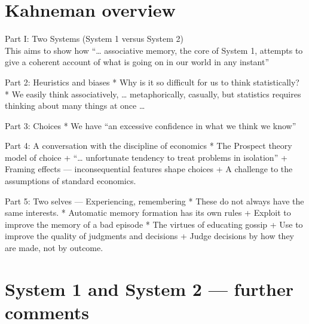 \documentclass[
  10pt,
  b5paper]{book}
\begin{document}
\hypertarget{kahneman-overview}{%
\section{Kahneman overview}\label{kahneman-overview}}

Part I: Two Systems (System 1 versus System 2)\\
This aims to show how
``\ldots{} associative memory, the core of System 1, attempts to give a coherent
account of what is going on in our world in any instant''

Part 2: Heuristics and biases
* Why is it so difficult for us to think statistically?
* We easily think associatively, \ldots{} metaphorically, casually,
but statistics requires thinking about many things at once \ldots{}

Part 3: Choices
* We have ``an excessive confidence in what we think we know''

Part 4: A conversation with the discipline of economics
* The Prospect theory model of choice
+ ``\ldots{} unfortunate tendency to treat problems in isolation''
+ Framing effects --- inconsequential features shape choices
+ A challenge to the assumptions of standard economics.

Part 5: Two selves --- Experiencing, remembering
* These do not always have the same interests.
* Automatic memory formation has its own rules
+ Exploit to improve the memory of a bad episode
* The virtues of educating gossip
+ Use to improve the quality of judgments and decisions
+ Judge decisions by how they are made, not by outcome.

\hypertarget{system-1-and-system-2-further-comments}{%
\section{System 1 and System 2 --- further comments}\label{system-1-and-system-2-further-comments}}
\end{document}
